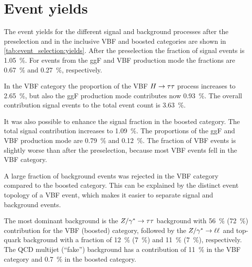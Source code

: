 \section{Event yields}\label{sec:event_selection:yields}

The event yields for the different signal and background processes after
the preselection and in the inclusive VBF and boosted categories are shown in \cref{tab:event_selection:yields}.
After the preselection the fraction of signal events is \SI{1.05}{\percent}.
For events from the ggF and VBF production mode the fractions are \SI{0.67}{\percent} and \SI{0.27}{\percent}, respectively.

In the VBF category the proportion of the VBF $H \to \tau \tau$ process increases to \SI{2.65}{\percent}, but also the ggF production mode
contributes now \SI{0.93}{\percent}.
The overall contribution signal events to the total event count is \SI{3.63}{\percent}.

It was also possible to enhance the signal fraction in the boosted category.
The total signal contribution increases to \SI{1.09}{\percent}.
The proportions of the ggF and VBF production mode are \SI{0.79}{\percent} and \SI{0.12}{\percent}.
The fraction of VBF events is slightly worse than after the preselection, because most VBF events fell in the VBF category.

A large fraction of background events was rejected in the VBF category compared to the boosted category.
This can be explained by the distinct event topology of a VBF event, which makes it easier to separate signal and background events.

The most dominant background is the $Z / \gamma^* \to \tau \tau$ background with \SI{56}{\percent} (\SI{72}{\percent}) contribution for the
VBF (boosted) category, followed by the
$Z / \gamma^* \to \ell \ell$ and top-quark background with a fraction of \SI{12}{\percent} (\SI{7}{\percent}) and \SI{11}{\percent} (\SI{7}{\percent}), respectively.
The QCD multijet (``fake'') background has a contribution of \SI{11}{\percent} in the VBF category and \SI{0.7}{\percent} in the boosted category.

